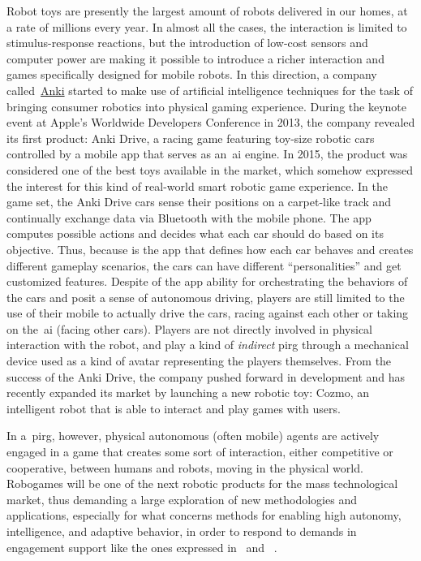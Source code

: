 Robot toys are presently the largest amount of robots delivered in our homes, at a rate of millions every year. In almost all the cases, the interaction is limited to stimulus-response reactions, but the introduction of low-cost sensors and computer power are making it possible to introduce a richer interaction and games specifically designed for mobile robots. In this direction, a company called~\href{https://anki.com/en-us}{Anki} started to make use of artificial intelligence techniques for the task of bringing consumer robotics into physical gaming experience. During the keynote event at Apple's Worldwide Developers Conference in 2013, the company revealed its first product: Anki Drive, a racing game featuring toy-size robotic cars controlled by a mobile app that serves as an~\gls{ai} engine. In 2015, the product was considered one of the best toys available in the market, which somehow expressed the interest for this kind of real-world smart robotic game experience. In the game set, the Anki Drive cars sense their positions on a carpet-like track and continually exchange data via Bluetooth with the mobile phone. The app computes possible actions and decides what each car should do based on its objective. Thus, because is the app that defines how each car behaves and creates different gameplay scenarios, the cars can have different ``personalities'' and get customized features. Despite of the app ability for orchestrating the behaviors of the cars and posit a sense of autonomous driving, players are still limited to the use of their mobile to actually drive the cars, racing against each other or taking on the~\gls{ai} (facing other cars). Players are not directly involved in physical interaction with the robot, and play a kind of \textit{indirect} \gls{pirg} through a mechanical device used as a kind of avatar representing the players themselves. From the success of the Anki Drive, the company pushed forward in development and has recently expanded its market by launching a new robotic toy: Cozmo, an intelligent robot that is able to interact and play games with users.

In a~\gls{pirg}, however, physical autonomous (often mobile) agents are actively engaged in a game that creates some sort of interaction, either competitive or cooperative, between humans and robots, moving in the physical world. Robogames will be one of the next robotic products for the mass technological market, thus demanding a large exploration of new methodologies and applications, especially for what concerns methods for enabling high autonomy, intelligence, and adaptive behavior, in order to respond to demands in engagement support like the ones expressed in~\cite{yannakakis_how_2008} and ~\cite{yannakakis_entertainment_2008,yannakakis_real-time_2009}. 

